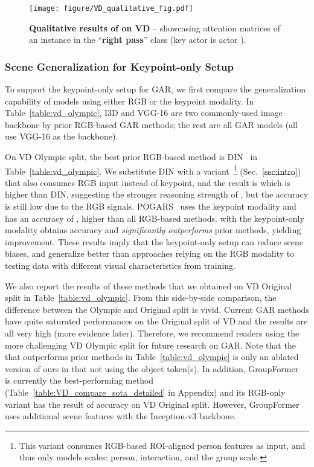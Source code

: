 \documentclass[runningheads]{llncs}
\begin{document}
  
  
  
  
  
  

  \begin{figure*}[t]
	\centering
	\texttt{[image: figure/VD\_qualitative\_fig.pdf]}
	\caption{\textbf{Qualitative results of \ours on VD} -- showcasing attention matrices
	of an instance in the ``\textbf{right pass}'' class (key actor is actor ).}
	\label{fig:VD_quali}
\end{figure*}









 
\subsubsection{Scene Generalization for Keypoint-only Setup}
To support the keypoint-only setup for GAR,
we first compare the generalization capability of models using either RGB or the keypoint modality.
In Table~\ref{table:vd_olympic}, 
I3D 
and VGG-16 are two commonly-used image backbone by prior RGB-based GAR methods; the rest are all GAR models (all use VGG-16 as the backbone).

On VD Olympic split, the best prior RGB-based method is DIN~\cite{yuan2021spatio} in Table~\ref{table:vd_olympic}. 
We substitute DIN with a \ours variant~\footnote{This \ours variant consumes RGB-based ROI-aligned person features as input, and thus only models  scales: person, interaction, and the group scale.} (Sec.~\ref{sec:intro}) that also consumes RGB input instead of keypoint, and the result is  
which is  higher than DIN, suggesting the stronger reasoning strength of \ourseos,
but the accuracy is still low due to the RGB signals. 
POGARS~\cite{POGARS} uses the keypoint modality and has an accuracy of , higher than all RGB-based methods. 
\ours with the  keypoint-only modality obtains  accuracy and \textit{significantly outperforms} prior methods, yielding  improvement.
These results imply that the keypoint-only setup 
can reduce scene biases, and generalize better than approaches relying on the RGB modality to testing data with different visual characteristics from training.




We also report the results of these methods that we obtained on VD Original split in Table~\ref{table:vd_olympic}. From this side-by-side comparison, the difference between the Olympic and Original split is vivid. Current GAR methods have quite saturated performances on the Original split of VD and the results are all very high (more evidence later).
Therefore, we recommend readers using the more challenging VD Olympic split
for future research on GAR. 
Note that the \ours that outperforms prior methods in Table~\ref{table:vd_olympic} is only an ablated version of ours in that not using the object token(s). In addition, GroupFormer~\cite{GroupFormer}  is  currently the best-performing method (Table~\ref{table:VD_compare_sota_detailed} in Appendix) and its RGB-only variant has the result of  accuracy on VD Original split. However, GroupFormer uses additional scene features with the Inception-v3 backbone.  
\end{document}

